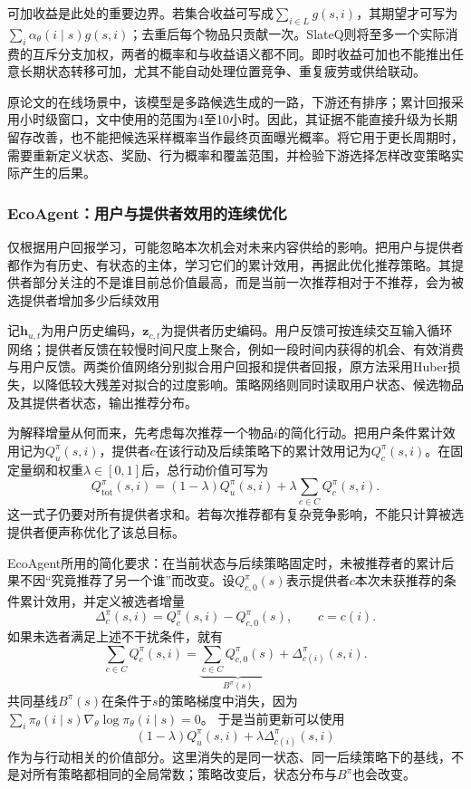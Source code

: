 可加收益是此处的重要边界。若集合收益可写成$\sum_{i\in L}g(s,i)$，其期望才可写为$\sum_i\alpha_\theta(i\mid s)g(s,i)$；去重后每个物品只贡献一次。SlateQ则将至多一个实际消费的互斥分支加权，两者的概率和与收益语义都不同。即时收益可加也不能推出任意长期状态转移可加，尤其不能自动处理位置竞争、重复疲劳或供给联动。

原论文的在线场景中，该模型是多路候选生成的一路，下游还有排序；累计回报采用小时级窗口，文中使用的范围为4至10小时。因此，其证据不能直接升级为长期留存改善，也不能把候选采样概率当作最终页面曝光概率。将它用于更长周期时，需要重新定义状态、奖励、行为概率和覆盖范围，并检验下游选择怎样改变策略实际产生的后果。

\subsubsection{EcoAgent：用户与提供者效用的连续优化}
\label{sec:rs-ecoagent}

仅根据用户回报学习，可能忽略本次机会对未来内容供给的影响。把用户与提供者都作为有历史、有状态的主体，学习它们的累计效用，再据此优化推荐策略。其提供者部分关注的不是谁目前总价值最高，而是当前一次推荐相对于不推荐，会为被选提供者增加多少后续效用

记$\bm{h}_{u,t}$为用户历史编码，$\bm{z}_{c,t}$为提供者历史编码。用户反馈可按连续交互输入循环网络；提供者反馈在较慢时间尺度上聚合，例如一段时间内获得的机会、有效消费与用户反馈。两类价值网络分别拟合用户回报和提供者回报，原方法采用Huber损失，以降低较大残差对拟合的过度影响。策略网络则同时读取用户状态、候选物品及其提供者状态，输出推荐分布。

为解释增量从何而来，先考虑每次推荐一个物品$i$的简化行动。把用户条件累计效用记为$Q_u^\pi(s,i)$，提供者$c$在该行动及后续策略下的累计效用记为$Q_c^\pi(s,i)$。在固定量纲和权重$\lambda\in[0,1]$后，总行动价值可写为
\[
 Q_{\mathrm{tot}}^\pi(s,i)
 =(1-\lambda)Q_u^\pi(s,i)
   +\lambda\sum_{c\in C}Q_c^\pi(s,i).
\]
这一式子仍要对所有提供者求和。若每次推荐都有复杂竞争影响，不能只计算被选提供者便声称优化了该总目标。

EcoAgent所用的简化要求：在当前状态与后续策略固定时，未被推荐者的累计后果不因“究竟推荐了另一个谁”而改变。设$Q_{c,0}^\pi(s)$表示提供者$c$本次未获推荐的条件累计效用，并定义被选者增量
\[
 \Delta_c^\pi(s,i)
 =Q_c^\pi(s,i)-Q_{c,0}^\pi(s),
 \qquad c=c(i).
\]
如果未选者满足上述不干扰条件，就有
\begin{equation}
 \sum_{c\in C}Q_c^\pi(s,i)
 =\underbrace{\sum_{c\in C}Q_{c,0}^\pi(s)}_{B^\pi(s)}
  +\Delta_{c(i)}^\pi(s,i).
 \label{eq:rs-provider-increment}
\end{equation}
共同基线$B^\pi(s)$在条件于$s$的策略梯度中消失，因为
$\sum_i\pi_\theta(i\mid s)\nabla_\theta\log\pi_\theta(i\mid s)=0$。
于是当前更新可以使用
\[
 (1-\lambda)Q_u^\pi(s,i)
 +\lambda\Delta_{c(i)}^\pi(s,i)
\]
作为与行动相关的价值部分。这里消失的是同一状态、同一后续策略下的基线，不是对所有策略都相同的全局常数；策略改变后，状态分布与$B^\pi$也会改变。

